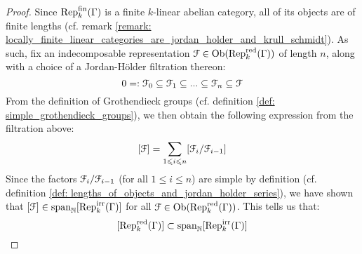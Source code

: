                     \begin{proof}
                        Since $\mathrm{Rep}_k^{\mathrm{fin}}(\Gamma)$ is a finite $k$-linear abelian category, all of its objects are of finite lengths (cf. remark \ref{remark: locally_finite_linear_categories_are_jordan_holder_and_krull_schmidt}). As such, fix an indecomposable representation $\mathcal{F} \in \mathrm{Ob}(\mathrm{Rep}_k^{\mathrm{red}}(\Gamma))$ of length $n$, along with a choice of a Jordan-H\"older filtration thereon:
                            $$0 =: \mathcal{F}_0 \subseteq \mathcal{F}_1 \subseteq ... \subseteq \mathcal{F}_n \subseteq \mathcal{F}$$
                        From the definition of Grothendieck groups (cf. definition \ref{def: simple_grothendieck_groups}), we then obtain the following expression from the filtration above:
                            $$[\mathcal{F}] = \sum_{1 \leqslant i \leqslant n} [\mathcal{F}_i/\mathcal{F}_{i - 1}]$$
                        Since the factors $\mathcal{F}_i/\mathcal{F}_{i - 1}$ (for all $1 \leq i \leq n$) are simple by definition (cf. definition \ref{def: lengths_of_objects_and_jordan_holder_series}), we have shown that $[\mathcal{F}] \in \operatorname{span}_{\mathbb{N}} [\mathrm{Rep}_k^{\mathrm{irr}}(\Gamma)]$ for all $\mathcal{F} \in \mathrm{Ob}(\mathrm{Rep}_k^{\mathrm{red}}(\Gamma))$. This tells us that:
                            $$[\mathrm{Rep}_k^{\mathrm{red}}(\Gamma)] \subset \operatorname{span}_{\mathbb{N}} [\mathrm{Rep}_k^{\mathrm{irr}}(\Gamma)]$$
                        

\end{proof}
